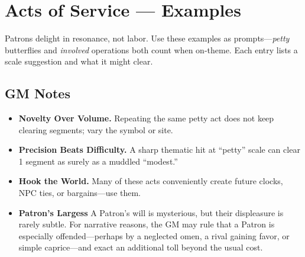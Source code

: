 \section{Acts of Service — Examples}\label{sec:acts-of-service-table}

Patrons delight in resonance, not labor. Use these examples as prompts---\emph{petty} butterflies and \emph{involved} operations both count when on-theme. Each entry lists a scale suggestion and what it might clear.
  
\subsection*{GM Notes}\label{subsec:acts-service-gm}
\begin{itemize}
\item \textbf{Novelty Over Volume.} Repeating the same petty act does not keep clearing segments; vary the symbol or site.
\item \textbf{Precision Beats Difficulty.} A sharp thematic hit at “petty” scale can clear 1 segment as surely as a muddled “modest.”
\item \textbf{Hook the World.} Many of these acts conveniently create future clocks, NPC ties, or bargains—use them.
\item \textbf{Patron’s Largess} A Patron’s will is mysterious, but their displeasure is rarely subtle. For narrative reasons, the GM may rule that a Patron is especially offended—perhaps by a neglected omen, a rival gaining favor, or simple caprice—and exact an additional toll beyond the usual cost.
\end{itemize}

